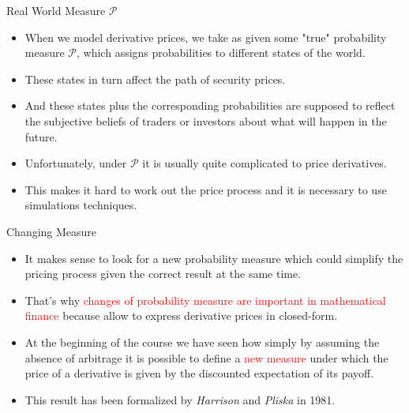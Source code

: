 \documentclass{beamer}
\begin{document}
\begin{frame}{Real World Measure $\mathcal{P}$}
\begin{itemize}
	\item When we model derivative prices, we take as given some "true" probability measure $\mathcal{P}$, which assigns probabilities to different states of the world. 
	\item These states in turn affect the path of security prices. 
	\item And these states plus the corresponding probabilities are supposed to reflect the subjective beliefs of traders or investors about what will happen in the future.
	\item Unfortunately, under $\mathcal{P}$ it is usually quite complicated to price derivatives.
	\item This makes it hard to work out the price process and it is necessary to use simulations techniques.
	\end{itemize}
\end{frame}

\begin{frame}{Changing Measure}
\begin{itemize}
	\item It makes sense to look for a new probability measure which could simplify the pricing process given the correct result at the same time.
	\item That's why \textcolor{red}{changes of probability measure are important in mathematical finance} because allow to express derivative prices in closed-form.
	\item At the beginning of the course we have seen how simply by assuming the absence of arbitrage it is possible to define a \textcolor{red}{new measure} under which the price of a derivative is given by the discounted expectation of its payoff.
	\item This result has been formalized by \emph{Harrison} and \emph{Pliska} in 1981. 
	\end{itemize}
\end{frame}
\end{document}
